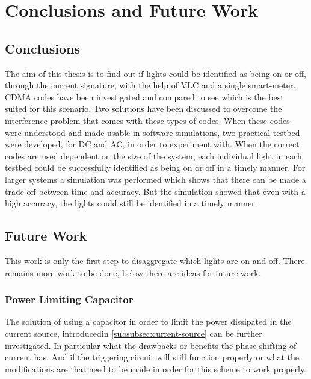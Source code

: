 
\chapter{Conclusions and Future Work}
\label{chp:conclusionsandfuturework}

	\section{Conclusions}


	The aim of this thesis is to find out if lights could be identified as being on or off, through the current signature, with the help of VLC and a single smart-meter.
	CDMA codes have been investigated and compared to see which is the best suited for this scenario.
	Two solutions have been discussed to overcome the interference problem that comes with these types of codes.
	When these codes were understood and made usable in software simulations, two practical testbed were developed, for DC and AC, in order to experiment with.
	When the correct codes are used dependent on the size of the system, each individual light in each testbed could be successfully identified as being on or off in a timely manner.
	For larger systems a simulation was performed which shows that there can be made a trade-off between time and accuracy. 
	But the simulation showed that even with a high accuracy, the lights could still be identified in a timely manner.






\section{Future Work}


This work is only the first step to disaggregate which lights are on and off.
There remains more work to be done, below there are ideas for future work.

	\subsection{Power Limiting Capacitor}

	The solution of using a capacitor in order to limit the power dissipated in the current source, introducedin \autoref{subsubsec:current-source} can be further investigated.
	In particular what the drawbacks or benefits the phase-shifting of current has.
	And if the triggering circuit will still function properly or what the modifications are that need to be made in order for this scheme to work properly.


